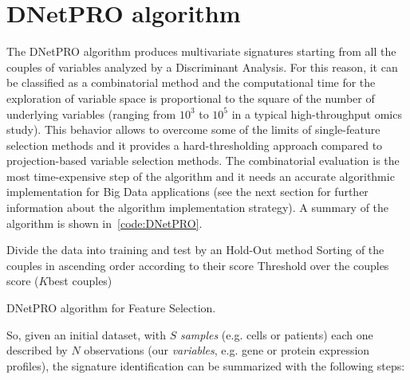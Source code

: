 \documentclass{standalone}
\begin{document}
\section[DNetPRO algorithm]{DNetPRO algorithm}\label{dnetpro:DNetPRO}

The \textsf{DNetPRO} algorithm produces multivariate signatures starting from all the couples of variables analyzed by a Discriminant Analysis.
For this reason, it can be classified as a combinatorial method and the computational time for the exploration of variable space is proportional to the square of the number of underlying variables (ranging from $10^3$ to $10^5$ in a typical high-throughput omics study).
This behavior allows to overcome some of the limits of single-feature selection methods and it provides a hard-thresholding approach compared to projection-based variable selection methods.
The combinatorial evaluation is the most time-expensive step of the algorithm and it needs an accurate algorithmic implementation for Big Data applications (see the next section for further information about the algorithm implementation strategy).
A summary of the algorithm is shown in~\ref{code:DNetPRO}.

\begin{algorithm}[H]
  Divide the data into training and test by an Hold-Out method\;
  Sorting of the couples in ascending order according to their score\;
  Threshold over the couples score ($K$best couples)\;
  \caption{DNetPRO algorithm for Feature Selection.}
  \label{code:DNetPRO}
\end{algorithm}

So, given an initial dataset, with $S$ \emph{samples} (e.g. cells or patients) each one described by $N$ observations (our \emph{variables}, e.g. gene or protein expression profiles), the signature identification can be summarized with the following steps:
\end{document}

